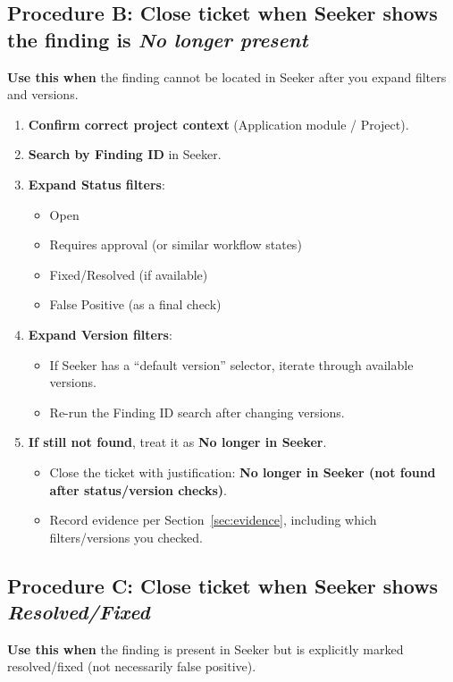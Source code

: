 \documentclass[11pt]{article}
\begin{document}
\subsection{Procedure B: Close ticket when Seeker shows the finding is \textit{No longer present}}
\textbf{Use this when} the finding cannot be located in Seeker after you expand filters and versions.

\begin{enumerate}[leftmargin=*]
  \item \textbf{Confirm correct project context} (Application module / Project).
  \item \textbf{Search by Finding ID} in Seeker.
  \item \textbf{Expand Status filters}:
  \begin{itemize}[leftmargin=*]
    \item Open
    \item Requires approval (or similar workflow states)
    \item Fixed/Resolved (if available)
    \item False Positive (as a final check)
  \end{itemize}
  \item \textbf{Expand Version filters}:
  \begin{itemize}[leftmargin=*]
    \item If Seeker has a ``default version'' selector, iterate through available versions.
    \item Re-run the Finding ID search after changing versions.
  \end{itemize}
  \item \textbf{If still not found}, treat it as \textbf{No longer in Seeker}.
  \begin{itemize}[leftmargin=*]
    \item Close the ticket with justification: \textbf{No longer in Seeker (not found after status/version checks)}.
    \item Record evidence per Section~\ref{sec:evidence}, including which filters/versions you checked.
  \end{itemize}
\end{enumerate}

\subsection{Procedure C: Close ticket when Seeker shows \textit{Resolved/Fixed}}
\textbf{Use this when} the finding is present in Seeker but is explicitly marked resolved/fixed (not necessarily false positive).
\end{document}
